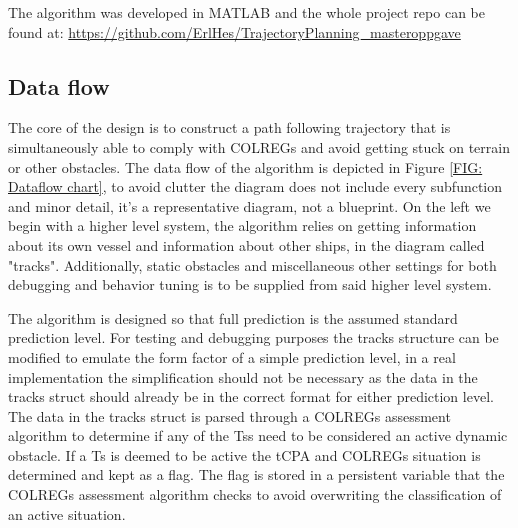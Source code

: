 The algorithm was developed in MATLAB and the whole project repo can be found at: \url{https://github.com/ErlHes/TrajectoryPlanning_masteroppgave}


\subsection{Data flow} %
The core of the design is to construct a path following trajectory that is simultaneously able to comply with \gls{COLREGs} and avoid getting stuck
on terrain or other obstacles. The data flow of the algorithm is depicted in Figure \ref{FIG: Dataflow chart}, 
to avoid clutter the diagram does not include every subfunction and minor detail, it's a
representative diagram, not a blueprint. On the left we begin with a higher level system, the algorithm
relies on getting information about its own vessel and information about other ships, in the diagram called "tracks". Additionally,
static obstacles and miscellaneous other settings for both debugging and behavior tuning is to be supplied from said higher level system.



The algorithm is designed so that full prediction is the assumed standard prediction level. For testing and debugging purposes the tracks
structure can be modified to emulate the form factor of a simple prediction level, in a real implementation the simplification should not be necessary
as the data in the tracks struct should already be in the correct format for either prediction level.
The data in the tracks struct is parsed through a \gls{COLREGs} assessment algorithm to determine if any of the \gls{Ts}s need to be considered
an active dynamic obstacle. If a \gls{Ts} is deemed to be active the \gls{tCPA} and \gls{COLREGs} situation is determined and kept as a flag. The flag
is stored in a persistent variable that the \gls{COLREGs} assessment algorithm checks to avoid overwriting the classification of an active situation.

